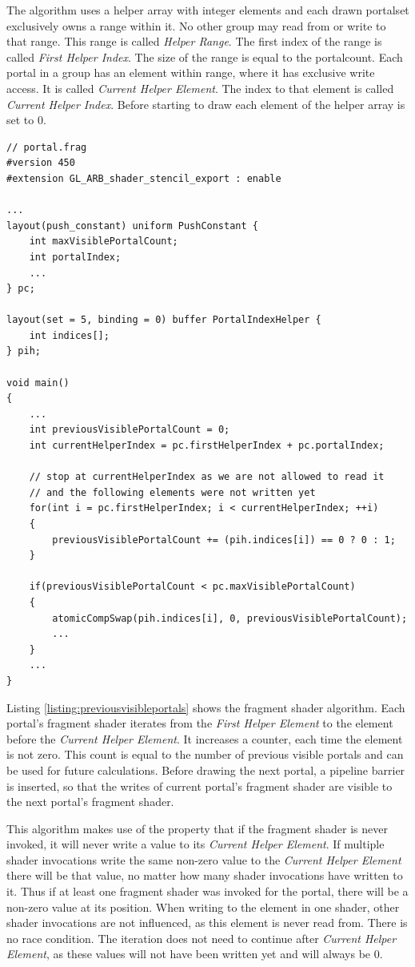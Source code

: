 The algorithm uses a helper array with integer elements and each drawn \gls{portalset} exclusively owns a range within it. No other group may read from or write to that range. This range is called \textit{Helper Range}. The first index of the range is called \textit{First Helper Index}. The size of the range is equal to the \gls{portalcount}. Each portal in a group has an element within range, where it has exclusive write access. It is called \textit{Current Helper Element}. The index to that element is called \textit{Current Helper Index}. Before starting to draw each element of the helper array is set to 0.

\begin{lstlisting}[caption={Calculate Previous Visible Portals}, label=listing:previousvisibleportals]
// portal.frag
#version 450
#extension GL_ARB_shader_stencil_export : enable

...
layout(push_constant) uniform PushConstant {	
	int maxVisiblePortalCount;
	int portalIndex;
	...
} pc;

layout(set = 5, binding = 0) buffer PortalIndexHelper {
	int indices[];
} pih;

void main()
{
	...
	int previousVisiblePortalCount = 0;
	int currentHelperIndex = pc.firstHelperIndex + pc.portalIndex;
	
	// stop at currentHelperIndex as we are not allowed to read it
	// and the following elements were not written yet
	for(int i = pc.firstHelperIndex; i < currentHelperIndex; ++i)
	{
		previousVisiblePortalCount += (pih.indices[i]) == 0 ? 0 : 1;
	}
	
	if(previousVisiblePortalCount < pc.maxVisiblePortalCount)
	{
		atomicCompSwap(pih.indices[i], 0, previousVisiblePortalCount);
		...
	}
	...
}
\end{lstlisting}

Listing \ref{listing:previousvisibleportals} shows the fragment shader algorithm. Each portal's fragment shader iterates from the \textit{First Helper Element} to the element before the \textit{Current Helper Element}. It increases a counter, each time the element is not zero. This count is equal to the number of previous visible portals and can be used for future calculations. Before drawing the next portal, a pipeline barrier is inserted, so that the writes of current portal's fragment shader are visible to the next portal's fragment shader.

This algorithm makes use of the property that if the fragment shader is never invoked, it will never write a value to its \textit{Current Helper Element}. If multiple shader invocations write the same non-zero value to the \textit{Current Helper Element} there will be that value, no matter how many shader invocations have written to it.
Thus if at least one fragment shader was invoked for the portal, there will be a non-zero value at its position. When writing to the element in one shader, other shader invocations are not influenced, as this element is never read from. There is no race condition. The iteration does not need to continue after \textit{Current Helper Element}, as these values will not have been written yet and will always be 0.

